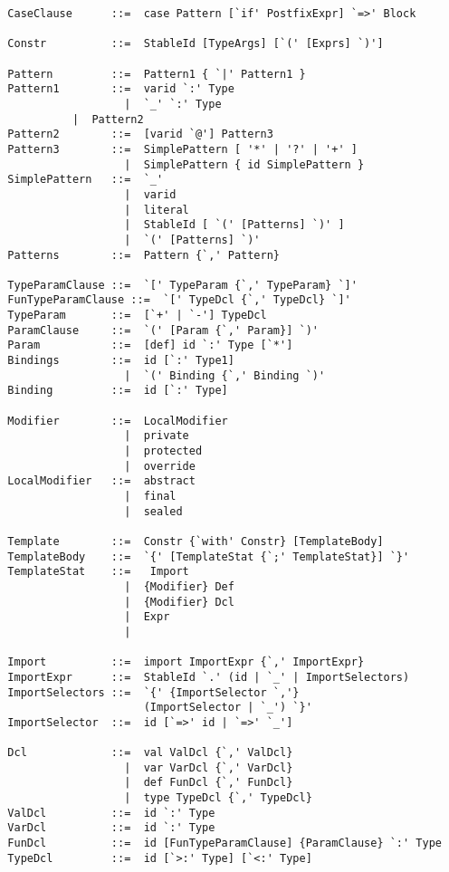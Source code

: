 \documentclass[a4paper,12pt,twoside,titlepage]{book}
\begin{document}
\begin{lstlisting}
  CaseClause      ::=  case Pattern [`if' PostfixExpr] `=>' Block 

  Constr          ::=  StableId [TypeArgs] [`(' [Exprs] `)']  

  Pattern         ::=  Pattern1 { `|' Pattern1 }
  Pattern1        ::=  varid `:' Type
                    |  `_' `:' Type
		    |  Pattern2
  Pattern2        ::=  [varid `@'] Pattern3
  Pattern3        ::=  SimplePattern [ '*' | '?' | '+' ]
                    |  SimplePattern { id SimplePattern }
  SimplePattern   ::=  `_'
                    |  varid
                    |  literal
                    |  StableId [ `(' [Patterns] `)' ]
                    |  `(' [Patterns] `)'
  Patterns        ::=  Pattern {`,' Pattern}

  TypeParamClause ::=  `[' TypeParam {`,' TypeParam} `]'
  FunTypeParamClause ::=  `[' TypeDcl {`,' TypeDcl} `]'
  TypeParam       ::=  [`+' | `-'] TypeDcl
  ParamClause     ::=  `(' [Param {`,' Param}] `)'
  Param           ::=  [def] id `:' Type [`*']
  Bindings        ::=  id [`:' Type1]
                    |  `(' Binding {`,' Binding `)'
  Binding         ::=  id [`:' Type]

  Modifier        ::=  LocalModifier
                    |  private
                    |  protected
                    |  override 
  LocalModifier   ::=  abstract
                    |  final
                    |  sealed

  Template        ::=  Constr {`with' Constr} [TemplateBody]
  TemplateBody    ::=  `{' [TemplateStat {`;' TemplateStat}] `}'
  TemplateStat    ::=   Import
                    |  {Modifier} Def
                    |  {Modifier} Dcl
                    |  Expr
                    |

  Import          ::=  import ImportExpr {`,' ImportExpr}
  ImportExpr      ::=  StableId `.' (id | `_' | ImportSelectors)
  ImportSelectors ::=  `{' {ImportSelector `,'} 
                       (ImportSelector | `_') `}'
  ImportSelector  ::=  id [`=>' id | `=>' `_']

  Dcl             ::=  val ValDcl {`,' ValDcl}
                    |  var VarDcl {`,' VarDcl}
                    |  def FunDcl {`,' FunDcl}
                    |  type TypeDcl {`,' TypeDcl}
  ValDcl          ::=  id `:' Type
  VarDcl          ::=  id `:' Type
  FunDcl          ::=  id [FunTypeParamClause] {ParamClause} `:' Type
  TypeDcl         ::=  id [`>:' Type] [`<:' Type]


\end{lstlisting}
\end{document}
